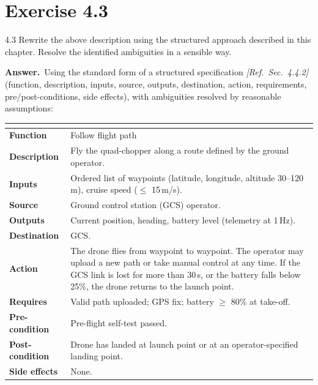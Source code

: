 \documentclass[11pt,a4paper]{article}
\makeatletter
\newcommand{\answer}{\par\noindent\textbf{Answer.}\ }
\newcommand{\refsec}[1]{\hfill\textit{\small[Ref.\ Sec.~#1]}}
\newcommand{\spec}[2]{\noindent\begin{tabularx}{\linewidth}{@{}>{\bfseries}p{3.3cm}X@{}}\toprule
\multicolumn{2}{@{}l}{\textbf{#1}}\\\midrule #2 \bottomrule\end{tabularx}\par\medskip}
\makeatother
\begin{document}
\section*{Exercise 4.3}
\begin{question}{4.3}
Rewrite the above description using the structured approach described in this chapter. Resolve the
identified ambiguities in a sensible way.
\end{question}
\answer Using the standard form of a structured specification \refsec{4.4.2}
(function, description, inputs, source, outputs, destination, action, requirements, pre/post-conditions,
side effects), with ambiguities resolved by reasonable assumptions:

\spec{Drone/SR/01 -- Follow preset flight path}{
Function & Follow flight path \\
Description & Fly the quad-chopper along a route defined by the ground operator. \\
Inputs & Ordered list of waypoints (latitude, longitude, altitude 30--120\,m), cruise speed ($\le$ 15\,m/s). \\
Source & Ground control station (GCS) operator. \\
Outputs & Current position, heading, battery level (telemetry at 1\,Hz). \\
Destination & GCS. \\
Action & The drone flies from waypoint to waypoint. The operator may upload a new path or take manual
control at any time. If the GCS link is lost for more than 30\,s, or the battery falls below 25\%, the
drone returns to the launch point. \\
Requires & Valid path uploaded; GPS fix; battery $\ge$ 80\% at take-off. \\
Pre-condition & Pre-flight self-test passed. \\
Post-condition & Drone has landed at launch point or at an operator-specified landing point. \\
Side effects & None. \\
}
\end{document}
